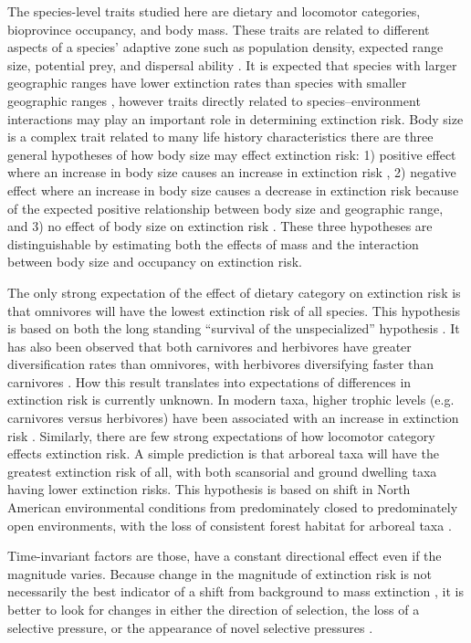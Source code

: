 \documentclass[12pt]{article}
\begin{document}
The species-level traits studied here are dietary and locomotor categories, bioprovince occupancy, and body mass. These traits are related to different aspects of a species' adaptive zone such as population density, expected range size, potential prey, and dispersal ability \cite{Smith2004,Jernvall2004}. It is expected that species with larger geographic ranges have lower extinction rates than species with smaller geographic ranges \cite{Jablonski1986,Roy2009c}, however traits directly related to species--environment interactions may play an important role in determining extinction risk. Body size is a complex trait related to many life history characteristics there are three general hypotheses of how body size may effect extinction risk: 1) positive effect where an increase in body size causes an increase in extinction risk \cite{Liow2008,Liow2009}, 2) negative effect where an increase in body size causes a decrease in extinction risk because of the expected positive relationship between body size and geographic range, and 3) no effect of body size on extinction risk \cite{Tomiya2013}. These three hypotheses are distinguishable by estimating both the effects of mass and the interaction between body size and occupancy on extinction risk.

The only strong expectation of the effect of dietary category on extinction risk is that omnivores will have the lowest extinction risk of all species. This hypothesis is based on both the long standing ``survival of the unspecialized'' hypothesis \cite{Liow2004a,Simpson1944}. It has also been observed that both carnivores and herbivores have greater diversification rates than omnivores, with herbivores diversifying faster than carnivores \cite{Price2012}. How this result translates into expectations of differences in extinction risk is currently unknown. In modern taxa, higher trophic levels (e.g. carnivores versus herbivores) have been associated with an increase in extinction risk \cite{Liow2009,Purvis2000a}. Similarly, there are few strong expectations of how locomotor category effects extinction risk. A simple prediction is that arboreal taxa will have the greatest extinction risk of all, with both scansorial and ground dwelling taxa having lower extinction risks. This hypothesis is based on shift in North American environmental conditions from predominately closed to predominately open environments, with the loss of consistent forest habitat for arboreal taxa \cite{Blois2009,Janis1993a}. 

Time-invariant factors are those, have a constant directional effect even if the magnitude varies. Because change in the magnitude of extinction risk is not necessarily the best indicator of a shift from background to mass extinction \cite{Wang2003}, it is better to look for changes in either the direction of selection, the loss of a selective pressure, or the appearance of novel selective pressures \cite{Jablonski1986}.
\end{document}
